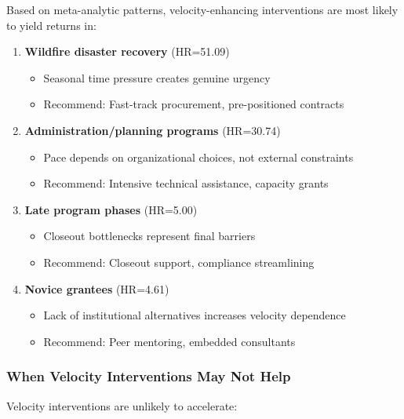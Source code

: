 \documentclass[
  12pt,
  letterpaper,
]{article}
\providecommand{\tightlist}{%
  \setlength{\itemsep}{0pt}\setlength{\parskip}{0pt}}
\begin{document}
Based on meta-analytic patterns, velocity-enhancing interventions are
most likely to yield returns in:

\begin{enumerate}
\def\labelenumi{\arabic{enumi}.}
\tightlist
\item
  \textbf{Wildfire disaster recovery} (HR=51.09)

  \begin{itemize}
  \tightlist
  \item
    Seasonal time pressure creates genuine urgency
  \item
    Recommend: Fast-track procurement, pre-positioned contracts
  \end{itemize}
\item
  \textbf{Administration/planning programs} (HR=30.74)

  \begin{itemize}
  \tightlist
  \item
    Pace depends on organizational choices, not external constraints
  \item
    Recommend: Intensive technical assistance, capacity grants
  \end{itemize}
\item
  \textbf{Late program phases} (HR=5.00)

  \begin{itemize}
  \tightlist
  \item
    Closeout bottlenecks represent final barriers
  \item
    Recommend: Closeout support, compliance streamlining
  \end{itemize}
\item
  \textbf{Novice grantees} (HR=4.61)

  \begin{itemize}
  \tightlist
  \item
    Lack of institutional alternatives increases velocity dependence
  \item
    Recommend: Peer mentoring, embedded consultants
  \end{itemize}
\end{enumerate}

\subsubsection{When Velocity Interventions May Not
Help}\label{when-velocity-interventions-may-not-help}

Velocity interventions are unlikely to accelerate:
\end{document}
